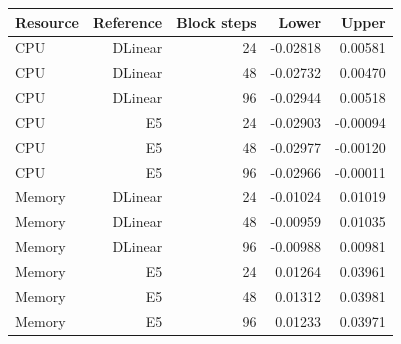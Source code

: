 \begin{tabular}{lrrrr}
\toprule
Resource & Reference & Block steps & Lower & Upper \\
\midrule
CPU & DLinear & 24 & -0.02818 & 0.00581 \\
CPU & DLinear & 48 & -0.02732 & 0.00470 \\
CPU & DLinear & 96 & -0.02944 & 0.00518 \\
CPU & E5 & 24 & -0.02903 & -0.00094 \\
CPU & E5 & 48 & -0.02977 & -0.00120 \\
CPU & E5 & 96 & -0.02966 & -0.00011 \\
Memory & DLinear & 24 & -0.01024 & 0.01019 \\
Memory & DLinear & 48 & -0.00959 & 0.01035 \\
Memory & DLinear & 96 & -0.00988 & 0.00981 \\
Memory & E5 & 24 & 0.01264 & 0.03961 \\
Memory & E5 & 48 & 0.01312 & 0.03981 \\
Memory & E5 & 96 & 0.01233 & 0.03971 \\
\bottomrule
\end{tabular}
